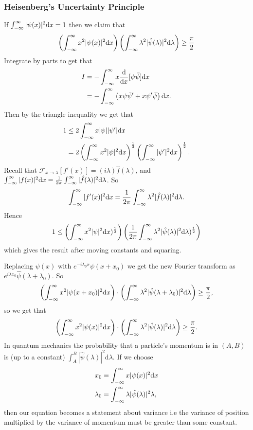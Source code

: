 \documentclass{article}
\begin{document}
\subsubsection{Heisenberg's Uncertainty Principle}
If $ \int_{-\infty}^\infty |\psi(x)|^2\mathrm dx=1 $ then we claim that
\[
	\left(\int_{-\infty}^\infty x^2|\psi(x)|^2\mathrm dx\right)\left(\int_{-\infty}^\infty \lambda^2|\hat \psi(\lambda)|^2\mathrm d\lambda\right)\ge \frac \pi 2
\]
Integrate by parts to get that
\begin{align*}
	I &= -\int_{-\infty}^\infty x\frac{\mathrm d}{\mathrm dx}[\psi\bar\psi]\mathrm dx\\
	  &= -\int_{-\infty}^\infty \left(x\psi\bar\psi'+x\psi'\bar\psi\right)\mathrm dx.\\
\end{align*}
Then by the triangle inequality we get that
\begin{align*}
	1&\le 2\int_{-\infty}^\infty x|\psi||\psi'|\mathrm dx\\
	 &=2\left(\int_{-\infty}^\infty x^2|\psi|^2\mathrm dx\right)^{\frac 12}\left(\int_{-\infty}^\infty |\psi'|^2\mathrm dx\right)^{\frac 12}.
\end{align*}
Recall that $ \mathcal F_{x\to \lambda}[f'(x)]=(i\lambda)\hat f(\lambda) $, and $ \int_{-\infty}^\infty |f(x)|^2\mathrm dx=\frac 1{2\pi}\int_{-\infty}^\infty |\hat f(\lambda)|^2\mathrm d\lambda $. So
\[
	\int_{-\infty}^\infty |f'(x)|^2\mathrm dx=\frac1{2\pi}\int_{-\infty}^\infty \lambda^2|\hat f(\lambda)|^2\mathrm d\lambda.
\]
Hence
\begin{align*}
	1\le \left(\int_{-\infty}^\infty x^2|\psi|^2\mathrm dx)^{\frac 12}\right)\left(\frac 1{2\pi}\int_{-\infty}^\infty \lambda^2 |\hat \psi(\lambda)|^2\mathrm d\lambda)^{\frac 12}\right)
\end{align*}
which gives the result after moving constants and squaring.
\par
Replacing $ \psi(x) $ with $ e^{-i\lambda_0 x}\psi(x+x_0) $ we get the new Fourier transform as $ e^{i\lambda x_0}\hat \psi(\lambda+\lambda_0) $. So 
\begin{align*}
  \left(\int_{-\infty}^\infty x^2|\psi(x+x_0)|^2\mathrm dx\right)\cdot\left(\int_{-\infty}^\infty \lambda^2|\hat\psi(\lambda+\lambda_0)|^2\mathrm d\lambda\right)\ge \frac \pi 2,
\end{align*}
so we get that 
\begin{align*}
    \left(\int_{-\infty}^\infty x^2|\psi(x)|^2\mathrm dx\right)\cdot\left(\int_{-\infty}^\infty \lambda^2|\hat\psi(\lambda)|^2\mathrm d\lambda\right)\ge \frac \pi 2.
\end{align*}
In quantum mechanics the probability that a particle's momentum is in $ (A,B) $ is (up to a constant) $ \int_A^B |\hat \psi(\lambda)|^2\mathrm d\lambda $. If we choose
\begin{align*}
	x_0&=\int_{-\infty}^\infty x|\psi(x)|^2\mathrm dx\\
	\lambda_0&=\int_{-\infty}^\infty \lambda|\hat \psi(\lambda)|^2\mathrm \lambda,
\end{align*}
then our equation becomes a statement about variance i.e the variance of position multiplied by the variance of momentum must be greater than some constant.
\end{document}
